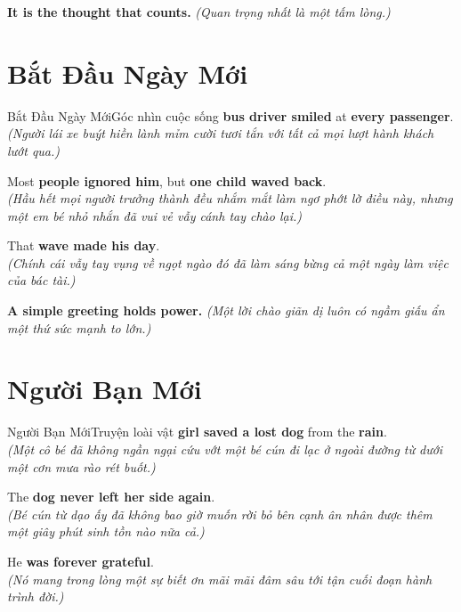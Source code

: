 \begin{baihoc}
  \textbf{It is the thought that counts.} \textit{(Quan trọng nhất là một tấm lòng.)}
\end{baihoc}

\vspace{0.8cm}

\ngayDay{}
\section{Bắt Đầu Ngày Mới}
\begin{truyen}{Bắt Đầu Ngày Mới}{Góc nhìn cuộc sống}
 \textbf{bus driver smiled} at \textbf{every passenger}.\\
\textit{(Người lái xe buýt hiền lành mỉm cười tươi tắn với tất cả mọi lượt hành khách lướt qua.)}

Most \textbf{people ignored him}, but \textbf{one child waved back}.\\
\textit{(Hầu hết mọi người trưởng thành đều nhắm mắt làm ngơ phớt lờ điều này, nhưng một em bé nhỏ nhắn đã vui vẻ vẫy cánh tay chào lại.)}

That \textbf{wave made his day}.\\
\textit{(Chính cái vẫy tay vụng về ngọt ngào đó đã làm sáng bừng cả một ngày làm việc của bác tài.)}
\end{truyen}

\begin{baihoc}
  \textbf{A simple greeting holds power.} \textit{(Một lời chào giãn dị luôn có ngầm giấu ẩn một thứ sức mạnh to lớn.)}
\end{baihoc}

\vspace{0.8cm}

\ngayDay{}
\section{Người Bạn Mới}
\begin{truyen}{Người Bạn Mới}{Truyện loài vật}
 \textbf{girl saved a lost dog} from the \textbf{rain}.\\
\textit{(Một cô bé đã không ngần ngại cứu vớt một bé cún đi lạc ở ngoài đường từ dưới một cơn mưa rào rét buốt.)}

The \textbf{dog never left her side again}.\\
\textit{(Bé cún từ dạo ấy đã không bao giờ muốn rời bỏ bên cạnh ân nhân được thêm một giây phút sinh tồn nào nữa cả.)}

He \textbf{was forever grateful}.\\
\textit{(Nó mang trong lòng một sự biết ơn mãi mãi đâm sâu tới tận cuối đoạn hành trình đời.)}
\end{truyen}

